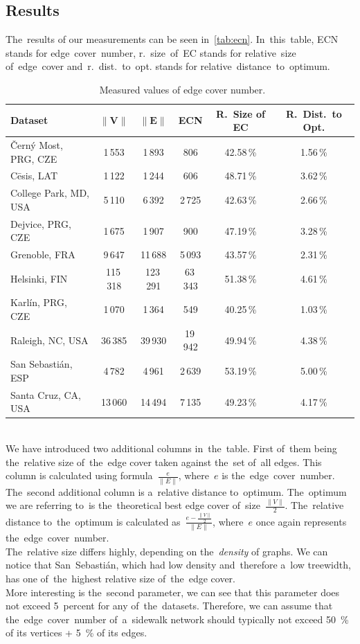 \subsection{Results}
The~results of our measurements can be seen in~\autoref{tab:ecn}. In~this~table, ECN stands for edge~cover~number, r.~size~of~EC stands for relative~size of~edge~cover and~r.~dist.~to~opt. stands for relative~distance~to~optimum.
\begin{table}[h!]
\centering
\caption[Measured values of edge cover number]{~Measured values of edge cover number.}\label{tab:ecn}
\begin{tabular}{l|c|c|c|c|c}
	\textbf{Dataset}		& $\|\mathbf{V}\|$		& $\|\mathbf{E}\|$& \textbf{ECN}   & \textbf{R.\ Size of EC}    & \textbf{R.\ Dist.\ to Opt.} \tabularnewline \hline \hline
 	Černý Most, PRG, CZE & 1\,553	& 1\,893 & 806 & 42.58\,\% & 1.56\,\%\tabularnewline \hline
 	Cēsis, LAT	& 1\,122	& 1\,244	& 606 & 48.71\,\% & 3.62\,\% \tabularnewline \hline
 	College Park, MD, USA & 5\,110 & 6\,392 & 2\,725 & 42.63\,\%	 & 2.66\,\%\tabularnewline \hline
 	Dejvice, PRG, CZE & 1\,675 & 1\,907 & 900 & 47.19\,\%	 & 3.28\,\%\tabularnewline \hline
 	Grenoble, FRA & 9\,647 & 11\,688 & 5\,093 & 43.57\,\%  & 2.31\,\%\tabularnewline \hline
    Helsinki, FIN & 115\,318 & 123\,291 & 63\,343 & 51.38\,\%	 & 4.61\,\%\tabularnewline \hline
 	Karlín, PRG, CZE & 1\,070 & 1\,364 & 549 & 40.25\,\%	 & 1.03\,\%\tabularnewline \hline
 	Raleigh, NC, USA & 36\,385 & 39\,930 & 19\,942 & 49.94\,\%	 & 4.38\,\%\tabularnewline \hline
 	San Sebastián, ESP & 4\,782 & 4\,961 & 2\,639 & 53.19\,\%	 & 5.00\,\%\tabularnewline \hline
 	Santa Cruz, CA, USA & 13\,060 & 14\,494 & 7\,135 & 49.23\,\%	 & 4.17\,\%\tabularnewline
\end{tabular}
\end{table}
\\
We have introduced two additional columns in~the~table. First of~them being the~relative size of~the~edge cover taken against the~set of~all edges. This column is calculated using formula~$\frac{e}{\|E\|}$, where~$e$ is the~edge~cover~number. The~second additional column is a~relative distance to~optimum. The~optimum we are referring to~is the~theoretical best edge cover of~size~$\frac{\|V\|}{2}$. The~relative distance to~the~optimum is calculated as~$\frac{e - \frac{\|V\|}{2}}{\|E\|}$, where~$e$ once again represents the~edge~cover~number. \\
The~relative size differs highly, depending on the~\textit{density} of graphs. We can notice that San~Sebastián, which had low density and~therefore a~low treewidth, has one of~the~highest relative size of~the~edge cover. \\
More interesting is the~second parameter, we can see that this parameter does not exceed 5~percent for any of~the~datasets. Therefore, we can assume that the~edge~cover~number of~a~sidewalk network should typically not exceed 50~\% of its vertices + 5~\% of its edges.
